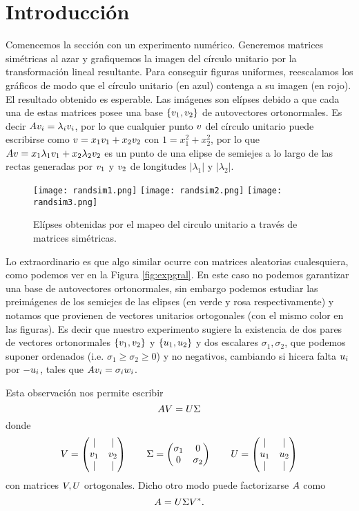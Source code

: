 \section{Introducción}
Comencemos la sección con un experimento numérico. Generemos matrices simétricas al azar y grafiquemos la imagen del círculo unitario por la transformación lineal resultante. Para conseguir figuras uniformes, reescalamos los gráficos de modo que el círculo unitario (en azul) contenga a su imagen (en rojo). El resultado obtenido es esperable. Las imágenes son elípses debido a que cada una de estas matrices posee una base
$\{\vb_1,\vb_2\}$ de autovectores ortonormales. Es decir $\Ab\vb_i=\lambda_i\vb_i$, por lo que cualquier punto $\vb$ del círculo unitario puede escribirse como $\vb=x_1\vb_1+x_2\vb_2$ con $1=x_1^2+x_2^2$, por lo que $A\vb=x_1\lambda_1\vb_1+x_2\lambda_2\vb_2$ es un punto de una elipse de semiejes a lo largo de
las rectas generadas por $\vb_1$ y $\vb_2$ de longitudes $|\lambda_1|$ y $|\lambda_2|$.

\begin{figure}\label{fig:expsimetrico}
\texttt{[image: randsim1.png]}
\texttt{[image: randsim2.png]}
\texttt{[image: randsim3.png]}
\caption{Elípses obtenidas por el mapeo del circulo unitario a través de matrices simétricas.}
\end{figure}
Lo extraordinario es que algo similar ocurre con matrices aleatorias cualesquiera, como podemos ver en la Figura \ref{fig:expgral}. En este caso no podemos garantizar una base de autovectores ortonormales, sin embargo podemos estudiar las preimágenes de los semiejes de las elipses (en verde y rosa respectivamente) y notamos que provienen de vectores unitarios ortogonales (con el mismo color en las figuras). Es decir que nuestro experimento sugiere la existencia de dos pares de vectores ortonormales $\{\vb_1,\vb_2\}$
y $\{\ub_1,\ub_2\}$ y dos escalares $\sigma_1,\sigma_2$, que podemos suponer ordenados (i.e. $\sigma_1\ge\sigma_2\ge 0$) y no negativos, cambiando si hicera falta $\ub_i$ por $-\ub_i$, tales que  $\Ab\vb_i=\sigma_i\wb_i$.

Esta observación nos permite escribir
$$
\Ab\Vb=\Ub\Sigmab
$$
donde
$$
\Vb=\begin{pmatrix} \vert &  \vert \\  \vb_1 &  \vb_2 \\ \vert &  \vert \end{pmatrix}\qquad
\Sigmab=\begin{pmatrix} \sigma_1 &  0 \\  0 &  \sigma_2 \end{pmatrix}\qquad
\Ub=\begin{pmatrix} \vert &  \vert \\  \ub_1 &  \ub_2 \\ \vert &  \vert \end{pmatrix}
$$
con matrices $\Vb,\Ub$ ortogonales. Dicho otro modo puede factorizarse $\Ab$ como
$$
\Ab=\Ub\Sigmab\Vb^*.
$$

